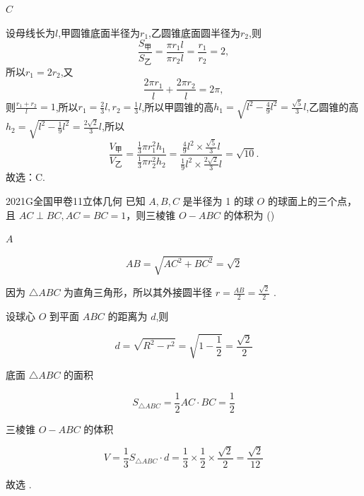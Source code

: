 \documentclass[12pt,UTF-8,a4paper]{ctexart}
\numberwithin{figure}{section}
\theoremstyle{mystyle}
\theoremstyle{mystylekaishu}
\theoremstyle{mystyle}
\numberwithin{xiti}{section}
\begin{document}
\begin{answer}
$C$
\end{answer}

\begin{solutions}
设母线长为$l$,甲圆锥底面半径为$r_1$,乙圆锥底面圆半径为$r_2$,则
$$
\frac{S_{\text{甲}}}{S_{\text{乙}}} = \frac{\pi r_1 l}{\pi r_2 l} = \frac{r_1}{r_2} = 2,
$$
所以$r_1 = 2r_2$,又
$$
\frac{2\pi r_1}{l} + \frac{2\pi r_2}{l} = 2\pi,
$$
则$\frac{r_1 + r_2}{l} = 1$,所以$r_1 = \frac{2}{3}l, r_2 = \frac{1}{3}l$,所以甲圆锥的高$h_1 = \sqrt{l^2 - \frac{4}{9}l^2} = \frac{\sqrt{5}}{3}l$,乙圆锥的高$h_2 = \sqrt{l^2 - \frac{1}{9}l^2} = \frac{2\sqrt{2}}{3}l$,所以
$$
\frac{V_{\text{甲}}}{V_{\text{乙}}} = \frac{\frac{1}{3}\pi r_1^2 h_1}{\frac{1}{3}\pi r_2^2 h_2} = \frac{\frac{4}{9}l^2 \times \frac{\sqrt{5}}{3}l}{\frac{1}{9}l^2 \times \frac{2\sqrt{2}}{3}l} = \sqrt{10}.
$$
故选：C.
\end{solutions}


\begin{problem}{2021}{G}{全国甲卷}{11}{立体几何}
已知 $A, B, C$ 是半径为 1 的球 $O$ 的球面上的三个点，且 $AC \perp BC, AC=BC=1$，则三棱锥 $O-ABC$ 的体积为 (\hspace{1cm})
\begin{choices}
\end{choices}
\end{problem}

\begin{answer}
$A$
\end{answer}

\begin{solutions}
$$
AB = \sqrt{AC^2 + BC^2} = \sqrt{2}
$$

因为 $\triangle ABC$ 为直角三角形，所以其外接圆半径 $r = \frac{AB}{2} = \frac{\sqrt{2}}{2}$ .

设球心 $O$ 到平面 $ABC$ 的距离为 $d$,则

$$
d = \sqrt{R^2 - r^2} = \sqrt{1 - \frac{1}{2}} = \frac{\sqrt{2}}{2}
$$

底面 $\triangle ABC$ 的面积

$$
S_{\triangle ABC} = \frac{1}{2} AC \cdot BC = \frac{1}{2}
$$

三棱锥 $O-ABC$ 的体积

$$
V = \frac{1}{3} S_{\triangle ABC} \cdot d = \frac{1}{3} \times \frac{1}{2} \times \frac{\sqrt{2}}{2} = \frac{\sqrt{2}}{12}
$$

故选  .
\end{solutions}
\end{document}

